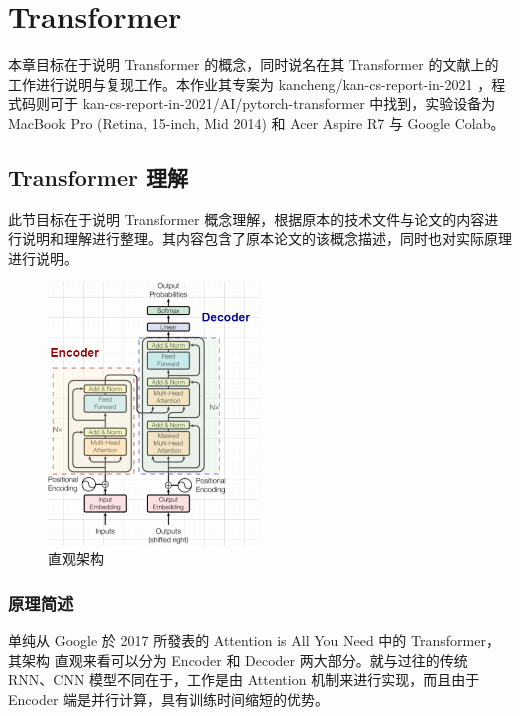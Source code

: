 \chapter{Transformer}
\label{chap:4}

本章目标在于说明 Transformer 的概念，同时说名在其 Transformer 的文献上的工作进行说明与复现工作。本作业其专案为 kancheng/kan-cs-report-in-2021 ，程式码则可于 kan-cs-report-in-2021/AI/pytorch-transformer 中找到，实验设备为 MacBook Pro (Retina, 15-inch, Mid 2014) 和 Acer Aspire R7 与 Google Colab。

\section{Transformer 理解}

此节目标在于说明 Transformer 概念理解，根据原本的技术文件与论文的内容进行说明和理解进行整理。其内容包含了原本论文的该概念描述，同时也对实际原理进行说明。

\begin{figure}[htb]
\centering 
\includegraphics[width=0.5\textwidth]{img/c4s1.png} 
\caption{直观架构}
\label{Test}
\end{figure}

\subsection{原理简述}

单纯从 Google 於 2017 所發表的 Attention is All You Need 中的 Transformer，其架构 直观来看可以分为  Encoder 和 Decoder 两大部分。就与过往的传统 RNN、CNN 模型不同在于，工作是由 Attention 机制来进行实现，而且由于 Encoder 端是并行计算，具有训练时间缩短的优势。

